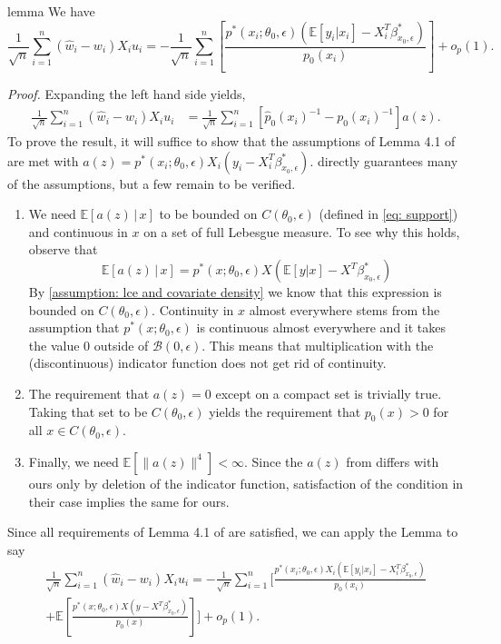 \documentclass[11pt]{article}
\begin{document}
\begin{restatable}{lemma}{} \label{lemma: newey lemma}
    We have
    \[\frac{1}{\sqrt{n}}\sum_{i = 1}^n(\hat{w}_i - w_i)X_iu_i = -\frac{1}{\sqrt{n}}\sum_{i = 1}^n\left[\frac{p^*(x_i;\theta_0, \epsilon)(\mathbb{E}[y_i|x_i] - X_i^T\beta^*_{x_0, \epsilon})}{p_0(x_i)}\right] + o_p(1).\]
\end{restatable}
\noindent \textit{Proof.} Expanding the left hand side yields,
\begin{align*}
    \frac{1}{\sqrt{n}}\sum_{i = 1}^n(\hat{w}_i - w_i)X_iu_i &= \frac{1}{\sqrt{n}}\sum_{i = 1}^n\left[\hat{p}_0(x_i)^{-1} - p_0(x_i)^{-1}\right]a(z).
\end{align*}
To prove the result, it will suffice to show that the assumptions of Lemma 4.1 of \citet{Newey_Ruud_2005} are met with $a(z) = p^*(x_i;\theta_0, \epsilon) X_i\left(y_i - X_i^T\beta^*_{x_0, \epsilon}\right)$.  directly guarantees many of the assumptions, but a few remain to be verified. 
\begin{enumerate}
    \item We need $\mathbb{E}[a(z)\,|\,x]$ to be bounded on $C(\theta_0, \epsilon)$ (defined in \cref{eq: support}) and continuous in $x$ on a set of full Lebesgue measure. To see why this holds, observe that 
    \[\mathbb{E}[a(z)\,|\,x] = p^*(x;\theta_0, \epsilon) X\left(\mathbb{E}[y | x] - X^T\beta^*_{x_0, \epsilon}\right)\]
    By \cref{assumption: lce and covariate density} we know that this expression is bounded on $C(\theta_0, \epsilon)$. Continuity in $x$ almost everywhere stems from the assumption that $p^*(x; \theta_0, \epsilon)$ is continuous almost everywhere and it takes the value $0$ outside of $\mathcal{B}(0, \epsilon)$. This means that multiplication with the (discontinuous) indicator function does not get rid of continuity. 
    \item The requirement that $a(z) = 0$ except on a compact set is trivially true. Taking that set to be $C(\theta_0, \epsilon)$ yields the requirement that $p_0(x) > 0$ for all $x \in C(\theta_0, \epsilon).$ 
    \item Finally, we need $\mathbb{E}\left[\|a(z)\|^4\right] < \infty$. Since the $a(z)$ from \citet{Newey_Ruud_2005} differs with ours only by deletion of the indicator function, satisfaction of the condition in their case implies the same for ours. 
\end{enumerate}
Since all requirements of Lemma 4.1 of \citet{Newey_Ruud_2005} are satisfied, we can apply the Lemma to say
\begin{multline}
    \frac{1}{\sqrt{n}}\sum_{i = 1}^n(\hat{w}_i - w_i)X_iu_i = -\frac{1}{\sqrt{n}}\sum_{i = 1}^n\Bigg[\frac{p^*(x_i;\theta_0, \epsilon) X_i\left(\mathbb{E}[y_i|x_i] - X_i^T\beta^*_{x_0, \epsilon}\right)}{p_0(x_i)} \\
    + \mathbb{E}\left[\frac{p^*(x;\theta_0, \epsilon) X\left(y - X^T\beta^*_{x_0, \epsilon}\right)}{p_0(x)}\right]\Bigg] + o_p(1).
\end{multline}
\end{document}

